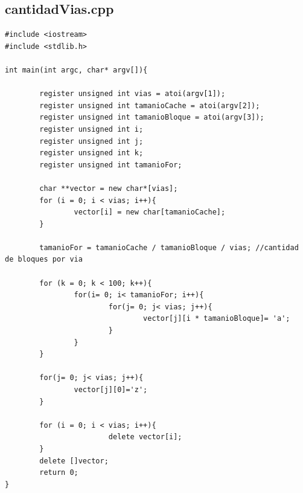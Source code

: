 \documentclass[a4paper,10pt]{article}
\begin{document}
\subsection{cantidadVias.cpp}
\begin{verbatim}
#include <iostream>
#include <stdlib.h>

int main(int argc, char* argv[]){

        register unsigned int vias = atoi(argv[1]);
        register unsigned int tamanioCache = atoi(argv[2]);
        register unsigned int tamanioBloque = atoi(argv[3]);
        register unsigned int i;
        register unsigned int j;
        register unsigned int k;
        register unsigned int tamanioFor;

        char **vector = new char*[vias];
        for (i = 0; i < vias; i++){
                vector[i] = new char[tamanioCache];
        }

        tamanioFor = tamanioCache / tamanioBloque / vias; //cantidad de bloques por via

        for (k = 0; k < 100; k++){
                for(i= 0; i< tamanioFor; i++){
                        for(j= 0; j< vias; j++){
                                vector[j][i * tamanioBloque]= 'a';
                        }
                }
        }

        for(j= 0; j< vias; j++){
                vector[j][0]='z';
        }

        for (i = 0; i < vias; i++){
                        delete vector[i];
        }
        delete []vector;
        return 0;
}
\end{verbatim}
\end{document}
